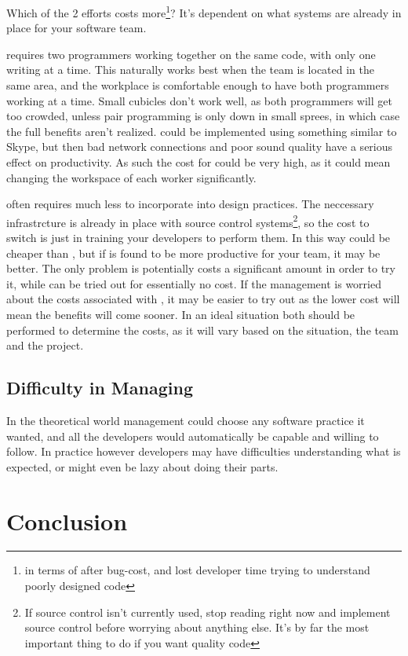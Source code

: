 \documentclass{article}
\begin{document}
Which of the 2 efforts costs more\footnote{in terms of after bug-cost, and lost developer time trying to understand poorly designed code}? It's dependent on what systems are already in place for your software team. 

\PP requires two programmers working together on the same code, with only one writing at a time. This naturally works best when the team is located in the same area, and the workplace is comfortable enough to have both programmers working at a time. Small cubicles don't work well, as both programmers will get too crowded, unless pair programming is only down in small sprees, in which case the full benefits aren't realized. \PP could be implemented using something similar to Skype, but then bad network connections and poor sound quality have a serious effect on productivity. As such the cost for \PP could be very high, as it could mean changing the workspace of each worker significantly.

\CR often requires much less to incorporate into design practices. The neccessary infrastrcture is already in place with source control systems\footnote{If source control isn't currently used, stop reading right now and implement source control before worrying about anything else. It's by far the most important thing to do if you want quality code}, so the cost to switch is just in training your developers to perform them. In this way \CR could be cheaper than \PP, but if \PP is found to be more productive for your team, it may be better. The only problem is \PP potentially costs a significant amount in order to try it, while \CR can be tried out for essentially no cost. If the management is worried about the costs associated with \PP, it may be easier to try out \CR as the lower cost will mean the benefits will come sooner. In an ideal situation both should be performed to determine the costs, as it will vary based on the situation, the team and the project.


\subsection{Difficulty in Managing}

In the theoretical world management could choose any software practice it wanted, and all the developers would automatically be capable and willing to follow. In practice however developers may have difficulties understanding what is expected, or might even be lazy about doing their parts.

\section{Conclusion}







\end{document}
